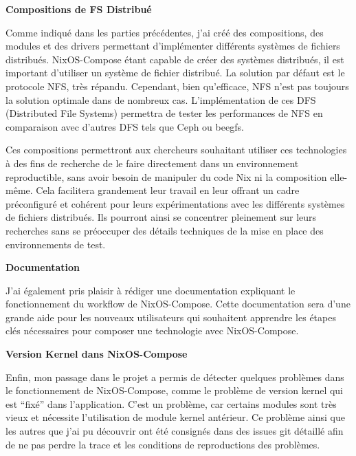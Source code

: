 \documentclass[a4paper,french,12pt, titlepage]{article}
\begin{document}
\textbf{Compositions de FS Distribué}\newline

Comme indiqué dans les parties précédentes, j'ai créé des compositions,
des modules et des drivers permettant d'implémenter différents systèmes
de fichiers distribués. NixOS-Compose étant capable de créer des
systèmes distribués, il est important d'utiliser un système de fichier
distribué. La solution par défaut est le protocole NFS, très répandu.
Cependant, bien qu'efficace, NFS n'est pas toujours la solution optimale
dans de nombreux cas. L'implémentation de ces DFS (Distributed File
Systems) permettra de tester les performances de NFS en comparaison avec
d'autres DFS tels que Ceph ou beegfs.\newline

Ces compositions permettront aux chercheurs souhaitant utiliser ces
technologies à des fins de recherche de le faire directement dans un
environnement reproductible, sans avoir besoin de manipuler du code Nix
ni la composition elle-même. Cela facilitera grandement leur travail en
leur offrant un cadre préconfiguré et cohérent pour leurs
expérimentations avec les différents systèmes de fichiers distribués.
Ils pourront ainsi se concentrer pleinement sur leurs recherches sans se
préoccuper des détails techniques de la mise en place des environnements
de test.\newline

\textbf{Documentation}\newline

J'ai également pris plaisir à rédiger une documentation expliquant le
fonctionnement du workflow de NixOS-Compose. Cette documentation sera
d'une grande aide pour les nouveaux utilisateurs qui souhaitent
apprendre les étapes clés nécessaires pour composer une technologie avec
NixOS-Compose.\newline

\textbf{Version Kernel dans NixOS-Compose}\newline

Enfin, mon passage dans le projet a permis de détecter quelques
problèmes dans le fonctionnement de NixOS-Compose, comme le problème de
version kernel qui est ``fixé'' dans l'application. C'est un problème,
car certains modules sont très vieux et nécessite l'utilisation de
module kernel antérieur. Ce problème ainsi que les autres que j'ai pu
découvrir ont été consignés dans des issues git détaillé afin de ne pas
perdre la trace et les conditions de reproductions des
problèmes.\newline
\end{document}
